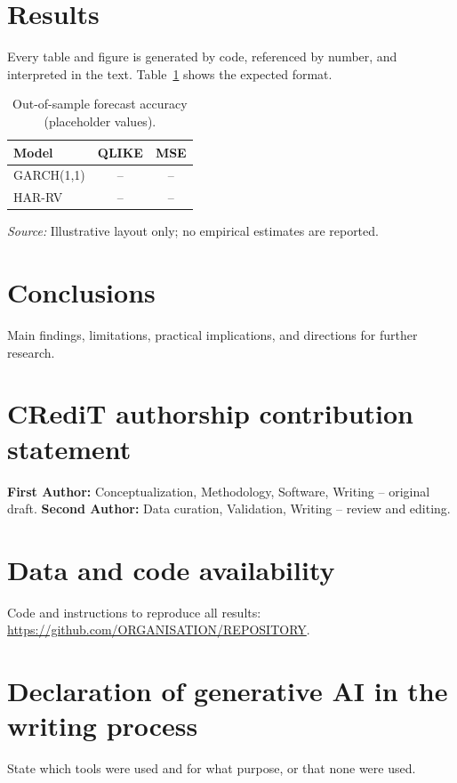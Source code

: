 \documentclass[preprint,12pt,authoryear]{elsarticle}
\newcommand{\source}[1]{\par\vspace{0.4\baselineskip}%
  {\footnotesize\raggedright\textit{Source:} #1\par}}
\providecommand{\articlebibliography}{references}
\begin{document}
\section{Results}
Every table and figure is generated by code, referenced by number, and interpreted in the text.
Table~\ref{tab:example} shows the expected format.

\begin{table}[ht]
  \centering
  \caption{Out-of-sample forecast accuracy (placeholder values).}
  \label{tab:example}
  \begin{tabular}{lcc}
    \toprule
    Model & QLIKE & MSE \\
    \midrule
    GARCH(1,1) & -- & -- \\
    HAR-RV     & -- & -- \\
    \bottomrule
  \end{tabular}
  \source{Illustrative layout only; no empirical estimates are reported.}
\end{table}

\section{Conclusions}
Main findings, limitations, practical implications, and directions for further research.

\section*{CRediT authorship contribution statement}
\textbf{First Author:} Conceptualization, Methodology, Software, Writing -- original draft.
\textbf{Second Author:} Data curation, Validation, Writing -- review and editing.

\section*{Data and code availability}
Code and instructions to reproduce all results: \url{https://github.com/ORGANISATION/REPOSITORY}.

\section*{Declaration of generative AI in the writing process}
State which tools were used and for what purpose, or that none were used.


\renewcommand{\bibsection}{\section*{\refname}\addcontentsline{toc}{section}{\refname}}

\end{document}
